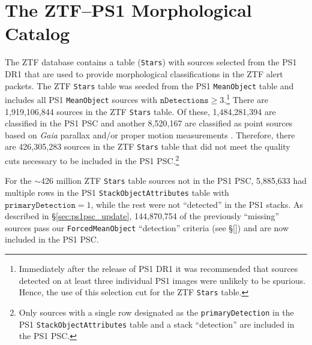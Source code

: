 \documentclass[twocolumn]{aastex63}
\begin{document}

\appendix

\section{The ZTF--PS1 Morphological Catalog}\label{app:cat_counts}

The ZTF database contains a table (\texttt{Stars}) with sources selected from
the PS1 DR1 that are used to provide morphological classifications in the ZTF
alert packets. The ZTF \texttt{Stars} table was seeded from the PS1
\texttt{MeanObject} table and includes all PS1 \texttt{MeanObject} sources
with $\mathtt{nDetections} \ge 3$.\footnote{Immediately after the release of
PS1 DR1 it was recommended that sources detected on at least three individual
PS1 images were unlikely to be spurious. Hence, the use of this selection cut
for the ZTF \texttt{Stars} table.} There are 1,919,106,844 sources in the ZTF
\texttt{Stars} table. Of these, 1,484,281,394 are classified in the PS1 PSC
and another 8,520,167 are classified as point sources based on \textit{Gaia}
parallax and/or proper motion measurements \citep{Tachibana18}. Therefore,
there are 426,305,283 sources in the ZTF \texttt{Stars} table that did not
meet the quality cuts necessary to be included in the PS1 PSC.\footnote{Only
sources with a single row designated as the \texttt{primaryDetection} in the
PS1 \texttt{StackObjectAttributes} table and a stack ``detection''
\citep[i.e., the PSF, Kron, and aperture flux are all $>0$ in at least one
filter, see][]{Tachibana18} are included in the PS1 PSC. }

For the $\sim$426 million ZTF \texttt{Stars} table sources not in the PS1 PSC,
5,885,633 had multiple rows in the PS1 \texttt{StackObjectAttributes} table
with $\mathtt{primaryDetection} = 1$, while the rest were not ``detected'' in
the PS1 stacks. As described in \S\ref{sec:ps1psc_update}, 144,870,754 of the
previously ``missing'' sources pass our \texttt{ForcedMeanObject}
``detection'' criteria (see \S\ref{}) and are now included in the PS1 PSC. 
\end{document}
